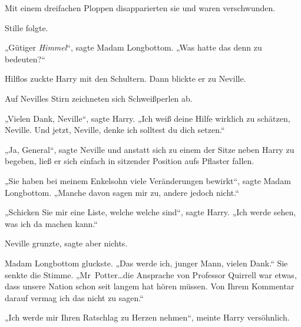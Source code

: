 Mit einem dreifachen Ploppen disapparierten sie und waren verschwunden.

Stille folgte.

„Gütiger \emph{Himmel}“, sagte Madam Longbottom. „Was hatte das denn zu bedeuten?“

Hilflos zuckte Harry mit den Schultern. Dann blickte er zu Neville.

Auf Nevilles Stirn zeichneten sich Schweißperlen ab.

„Vielen Dank, Neville“, sagte Harry. „Ich weiß deine Hilfe wirklich zu schätzen, Neville. Und jetzt, Neville, denke ich solltest du dich setzen.“

„Ja, General“, sagte Neville und anstatt sich zu einem der Sitze neben Harry zu begeben, ließ er sich einfach in sitzender Position aufs Pflaster fallen.

„Sie haben bei meinem Enkelsohn viele Veränderungen bewirkt“, sagte Madam Longbottom. „Manche davon sagen mir zu, andere jedoch nicht.“

„Schicken Sie mir eine Liste, welche welche sind“, sagte Harry. „Ich werde sehen, was ich da machen kann.“

Neville grunzte, sagte aber nichts.

Madam Longbottom gluckste. „Das werde ich, junger Mann, vielen Dank.“ Sie senkte die Stimme. „Mr~Potter…die Ansprache von Professor Quirrell war etwas, dass unsere Nation schon seit langem hat hören müssen. Von Ihrem Kommentar darauf vermag ich das nicht zu sagen.“

„Ich werde mir Ihren Ratschlag zu Herzen nehmen“, meinte Harry versöhnlich.


